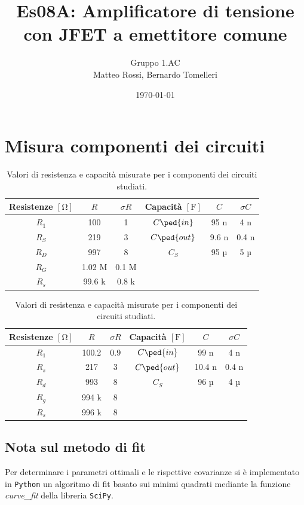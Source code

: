 \documentclass[10pt, a4paper, italian]{article}
\author{Gruppo 1.AC \\ Matteo Rossi, Bernardo Tomelleri}
\title{Es08A: Amplificatore di tensione con JFET a emettitore comune}
\begin{document}
\date{\today}
\maketitle

\setcounter{section}{0}

\section{Misura componenti dei circuiti}
\begin{table}[htbp]
\centering
\begin{tabular}{cccccc}
\toprule
Resistenze $[\si{\ohm}]$ & $R$ & $\sigma R$ & Capacità $[\si{\F}]$ & $C$ &
$\sigma C$ \\
\midrule
\midrule
$R_1$	  & 100 	& 1 	 & $C\ped{in}$ & 95	n	 & 4 n \\
$R_S$	  & 219	& 3 	 & $C\ped{out}$ & 9.6 n	 & 0.4 n \\
$R_D$	  & 997		& 8	 	 & $C_S$ 		& 95  µ  & 5 µ \\
$R_G$	  & 1.02 M	& 0.1 M	 & & & \\
$R_s$	  & 99.6 k	& 0.8 k	 & & & \\
\bottomrule     
\end{tabular}
\caption{Valori di resistenza e capacità misurate per i componenti dei
circuiti studiati. \label{tab: rcmes_M}}
\end{table}

\begin{table}[htbp]
\centering
\begin{tabular}{cccccc}
\toprule
Resistenze $[\si{\ohm}]$ & $R$ & $\sigma R$ & Capacità $[\si{\F}]$ & $C$ &
$\sigma C$ \\
\midrule
\midrule
$R_1$	  & 100.2 	& 0.9 	 & $C\ped{in}$ & 99	n	 & 4 n \\
$R_s$	  & 217	& 3 	 & $C\ped{out}$ & 10.4 n	 & 0.4 n \\
$R_d$	  & 993		& 8	 	 & $C_S$ 		& 96  µ  & 4 µ \\
$R_g$	  & 994 k	& 8	 & & & \\
$R_s$	  & 996 k	& 8	 & & & \\
\bottomrule     
\end{tabular}
\caption{Valori di resistenza e capacità misurate per i componenti dei
circuiti studiati. \label{tab: rcmes_B}}
\end{table}

\subsection*{Nota sul metodo di fit}
Per determinare i parametri ottimali e le rispettive covarianze si \`e
implementato in \verb+Python+ un algoritmo di fit basato sui minimi quadrati
mediante la funzione \emph{curve\_fit} della libreria \texttt{SciPy}.
\end{document}
